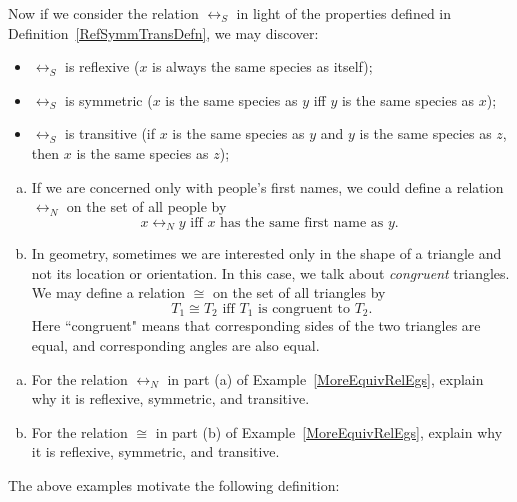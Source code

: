Now if we consider the relation $\rel_S$ in light of the properties defined in Definition~\ref{RefSymmTransDefn}, we may discover:
\begin{itemize}
\item  $\rel_S$ is reflexive ($x$ is always the same species as itself);
\item  $\rel_S$ is symmetric ($x$ is the same species as $y$ iff $y$ is the same species as $x$);
\item  $\rel_S$ is transitive (if $x$ is the same species as $y$ and $y$ is the same species as $z$, then $x$ is the same species as $z$);
\end{itemize}

\begin{eg} \label{MoreEquivRelEgs}
\begin{enumerate}[(a)]
\item
If we are concerned only with people's first names, we could define a relation~$\rel_N$ on the set of all people by 
	$$ \text{$x \rel_N y$ iff $x$~has the same first name as~$y$. } $$
\item In geometry, sometimes we are interested only in the shape of a triangle and not its location or orientation. In this case, we talk about \emph{congruent} triangles. We may define a relation $\cong$ on the set of all triangles by 
	$$ \text{$T_1 \cong T_2$ iff $T_1$ is {congruent} to~$T_2$.} $$
Here ``congruent" means that corresponding sides of the two triangles are equal, and corresponding angles are also equal.
\end{enumerate}
\end{eg}

\begin{exercise}
\begin{enumerate}[(a)]
\item
For the relation $\rel_N$ in part (a) of Example~\ref{MoreEquivRelEgs}, explain why it is reflexive, symmetric, and transitive.
\item
For the relation $\cong$ in part (b) of Example~\ref{MoreEquivRelEgs}, explain why it is reflexive, symmetric, and transitive.

\end{enumerate}
\end{exercise}

The above examples motivate the following definition:

